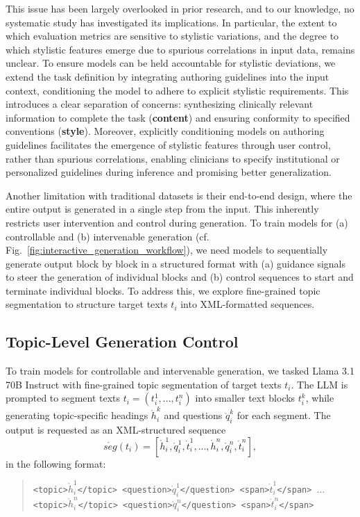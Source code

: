 This issue has been largely overlooked in prior research, and to our knowledge, no systematic study has investigated its implications. In particular, the extent to which evaluation metrics are sensitive to stylistic variations, and the degree to which stylistic features emerge due to spurious correlations in input data, remains unclear.
To ensure models can be held accountable for stylistic deviations, we extend the task definition by integrating authoring guidelines into the input context, conditioning the model to adhere to explicit stylistic requirements. This introduces a clear separation of concerns: synthesizing clinically relevant information to complete the task (\textbf{content}) and ensuring conformity to specified conventions (\textbf{style}). Moreover, explicitly conditioning models on authoring guidelines facilitates the emergence of stylistic features through user control, rather than spurious correlations, enabling clinicians to specify institutional or personalized guidelines during inference and promising better generalization.

Another limitation with traditional datasets is their end-to-end design, where the entire output is generated in a single step from the input. This inherently restricts user intervention and control during generation. To train models for (a) controllable and (b) intervenable generation (cf. Fig.~\ref{fig:interactive_generation_workflow}), we need models to sequentially generate output block by block in a structured format with (a) guidance signals to steer the generation of individual blocks and (b) control sequences to start and terminate individual blocks. To address this, we explore fine-grained topic segmentation to structure target texts $t_i$ into XML-formatted sequences.


\subsection{Topic-Level Generation Control}
\label{sec:topic-level-generation-control}
To train models for controllable and intervenable generation,
we tasked Llama 3.1 70B Instruct with fine-grained topic segmentation of target texts $t_i$. The LLM is prompted to segment texts $t_i = (t_i^1, ..., t_i^n)$ into smaller text blocks $t_i^k$, while generating topic-specific headings $\mathring{h}_i^k$ and questions $\mathring{q}_i^k$ for each segment. The output is requested as an XML-structured sequence $$\mathring{seg}(t_i) = \left[
\mathring{h}_i^1, \mathring{q}_i^1, \mathring{t}_i^1, ..., \mathring{h}_i^n, \mathring{q}_i^n, \mathring{t}_i^n\right],$$ in the following format:
\begin{quote}
\texttt{<topic>$\mathring{h}_i^1$</topic>\newline
<question>$\mathring{q}_i^1$</question>\newline
<span>$\mathring{t}_i^1$</span>\newline
$\dots$\newline
<topic>$\mathring{h}_i^n$</topic>\newline
<question>$\mathring{q}_i^n$</question>\newline
<span>$\mathring{t}_i^n$</span>}
\end{quote}


